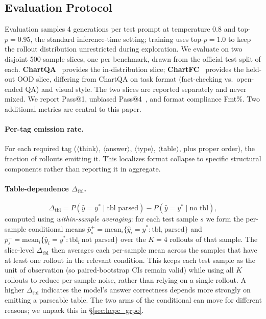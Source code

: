 \documentclass[11pt]{article}
\begin{document}
\subsection{Evaluation Protocol}
\label{sec:eval_protocol}

Evaluation samples 4 generations per test prompt at temperature 0.8
and top-$p{=}0.95$, the standard inference-time setting; training
uses top-$p{=}1.0$ to keep the rollout distribution unrestricted
during exploration. We evaluate on two disjoint 500-sample slices,
one per benchmark, drawn from the official test split of each.
\textbf{ChartQA}~\citep{chartqa} provides the in-distribution slice;
\textbf{ChartFC}~\citep{chartfc} provides the held-out OOD slice,
differing from ChartQA on task format (fact-checking vs.\ open-ended
QA) and visual style. The two slices are reported separately and
never mixed.
We report Pass@1, unbiased Pass@4~\citep{passatk}, and format
compliance Fmt\%. Two additional metrics are central to this paper.

\paragraph{Per-tag emission rate.} For each required tag
($\langle$think$\rangle$, $\langle$answer$\rangle$,
$\langle$type$\rangle$, $\langle$table$\rangle$, plus proper order),
the fraction of rollouts emitting it. This localizes format collapse
to specific structural components rather than reporting it in aggregate.

\paragraph{Table-dependence $\Delta_{\text{tbl}}$.}
\[
\Delta_{\text{tbl}} = P(\hat y=y^*\mid\text{tbl parsed})
                    - P(\hat y=y^*\mid\text{no tbl}),
\]
computed using \emph{within-sample averaging}: for each test sample
$s$ we form the per-sample conditional means $\bar p^{+}_s =
\mathrm{mean}_i\{\hat y_i = y^* : \text{tbl}_i\ \text{parsed}\}$ and
$\bar p^{-}_s = \mathrm{mean}_i\{\hat y_i = y^* : \text{tbl}_i\
\text{not parsed}\}$ over the $K{=}4$ rollouts of that sample. The
slice-level $\Delta_{\text{tbl}}$ then averages each per-sample mean
across the samples that have at least one rollout in the relevant
condition. This keeps each test sample as the unit of observation
(so paired-bootstrap CIs remain valid) while using all $K$ rollouts
to reduce per-sample noise, rather than relying on a single rollout. A higher $\Delta_{\text{tbl}}$ indicates the model's answer
correctness depends more strongly on emitting a parseable table.
The two arms of the conditional can move for different reasons; we
unpack this in \S\ref{sec:hcpc_grpo}.
\end{document}
